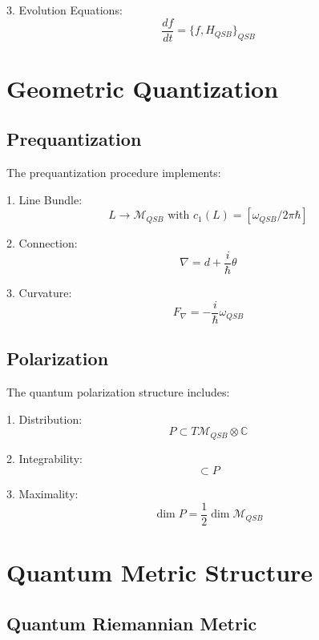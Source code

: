 \documentclass[12pt]{article}
\begin{document}
3. Evolution Equations:
\begin{equation}
\frac{df}{dt} = \{f,H_{QSB}\}_{QSB}
\end{equation}

\section{Geometric Quantization}

\subsection{Prequantization}

The prequantization procedure implements:

1. Line Bundle:
\begin{equation}
L \rightarrow \mathcal{M}_{QSB} \text{ with } c_1(L) = [ω_{QSB}/2π\hbar]
\end{equation}

2. Connection:
\begin{equation}
\nabla = d + \frac{i}{\hbar}θ
\end{equation}

3. Curvature:
\begin{equation}
F_\nabla = -\frac{i}{\hbar}ω_{QSB}
\end{equation}

\subsection{Polarization}

The quantum polarization structure includes:

1. Distribution:
\begin{equation}
P \subset T\mathcal{M}_{QSB} \otimes \mathbb{C}
\end{equation}

2. Integrability:
\begin{equation}
[P,P] \subset P
\end{equation}

3. Maximality:
\begin{equation}
\dim P = \frac{1}{2}\dim \mathcal{M}_{QSB}
\end{equation}

\section{Quantum Metric Structure}

\subsection{Quantum Riemannian Metric}
\end{document}

